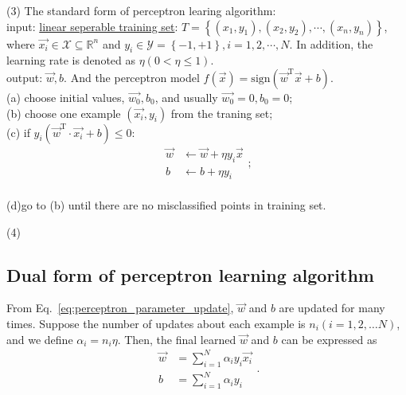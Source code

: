 \documentclass[10pt,onecolumn]{book}
\begin{document}
(3) The standard form of perceptron learing algorithm: \\
\indent	\indent input: \uline{linear seperable training set}: $T = \left\{ (x_1, y_1), (x_2, y_2), \cdots, (x_n ,y_n) \right\}$, where $\vec{x_i} \in \mathcal{X} \subseteq \mathbb{R}^n$ and $y_i \in \mathcal{Y} = \left\{-1, +1\right\}, i = 1, 2, \cdots, N$. In addition, the learning rate is denoted 
as $\eta (0 < \eta \le 1)$. \\
\indent \indent output: $\vec{w}, b$. And the perceptron model $f(\vec{x}) = \mathrm{sign}(\vec{w}^\mathrm{T} \vec{x} + b)$. \\
\indent \indent (a) choose initial values, $\vec{w_0}, b_0$, and usually $\vec{w_0} = 0, b_0 = 0$; \\
\indent \indent (b) choose one example $(\vec{x_i}, y_i)$ from the traning set; \\
\indent \indent (c) if $y_{i} (\vec{w}^\mathrm{T}  \cdot \vec{x_{i}} + b) \le 0$:
\begin{equation}
\begin{split}
\vec{w} & \gets \vec{w} + \eta y_i \vec{x} \\
	b & \gets b + \eta y_i
\end{split};
\end{equation} \\
\indent \indent (d)go to (b) until there are no misclassified points in training set.


(4) 

\subsection{Dual form of perceptron learning algorithm}
From Eq.~\ref{eq:perceptron_parameter_update}, $\vec{w}$ and $b$ are updated for many times. Suppose the number of updates about each example is $n_i (i = 1, 2, \dots N)$, and we define $\alpha_i = n_i \eta$. Then, the final learned $\vec{w}$ and $b$ can be expressed as
\begin{equation}
\begin{split}
	\vec{w} & = \sum_{i = 1}^{N} \alpha_i y_i \vec{x_i} \\
	b 		& = \sum_{i = 1}^{N} \alpha_i y_i
\end{split}.
\end{equation}
\end{document}
